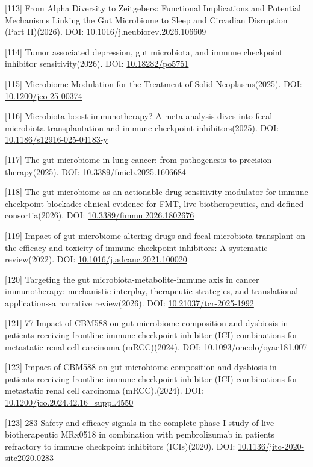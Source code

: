\documentclass[11pt]{article}
\begin{document}
{[}113{]} From Alpha Diversity to Zeitgebers: Functional Implications and Potential Mechanisms Linking the Gut Microbiome to Sleep and Circadian Disruption (Part II)(2026). DOI: \url{10.1016/j.neubiorev.2026.106609}

{[}114{]} Tumor associated depression, gut microbiota, and immune checkpoint inhibitor sensitivity(2026). DOI: \url{10.18282/po5751}

{[}115{]} Microbiome Modulation for the Treatment of Solid Neoplasms(2025). DOI: \url{10.1200/jco-25-00374}

{[}116{]} Microbiota boost immunotherapy? A meta-analysis dives into fecal microbiota transplantation and immune checkpoint inhibitors(2025). DOI: \url{10.1186/s12916-025-04183-y}

{[}117{]} The gut microbiome in lung cancer: from pathogenesis to precision therapy(2025). DOI: \url{10.3389/fmicb.2025.1606684}

{[}118{]} The gut microbiome as an actionable drug-sensitivity modulator for immune checkpoint blockade: clinical evidence for FMT, live biotherapeutics, and defined consortia(2026). DOI: \url{10.3389/fimmu.2026.1802676}

{[}119{]} Impact of gut-microbiome altering drugs and fecal microbiota transplant on the efficacy and toxicity of immune checkpoint inhibitors: A systematic review(2022). DOI: \url{10.1016/j.adcanc.2021.100020}

{[}120{]} Targeting the gut microbiota-metabolite-immune axis in cancer immunotherapy: mechanistic interplay, therapeutic strategies, and translational applications-a narrative review(2026). DOI: \url{10.21037/tcr-2025-1992}

{[}121{]} 77 Impact of CBM588 on gut microbiome composition and dysbiosis in patients receiving frontline immune checkpoint inhibitor (ICI) combinations for metastatic renal cell carcinoma (mRCC)(2024). DOI: \url{10.1093/oncolo/oyae181.007}

{[}122{]} Impact of CBM588 on gut microbiome composition and dysbiosis in patients receiving frontline immune checkpoint inhibitor (ICI) combinations for metastatic renal cell carcinoma (mRCC).(2024). DOI: \url{10.1200/jco.2024.42.16_suppl.4550}

{[}123{]} 283 Safety and efficacy signals in the complete phase I study of live biotherapeutic MRx0518 in combination with pembrolizumab in patients refractory to immune checkpoint inhibitors (ICIs)(2020). DOI: \url{10.1136/jitc-2020-sitc2020.0283}
\end{document}
